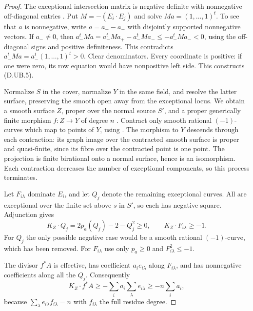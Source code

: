 \begin{proof}
The exceptional intersection matrix is negative definite
with nonnegative off-diagonal entries
\cite[section 10.1, Theorem 10.1]{Kollar2013D}.
Put $M=-(E_i\cdot E_j)$ and solve $Ma=(1,\ldots,1)^t$.
To see that $a$ is nonnegative, write $a=a_+-a_-$ with
disjointly supported nonnegative vectors. If $a_-\ne0$, then
$a_-^tMa=a_-^tMa_+-a_-^tMa_-\leq-a_-^tMa_-<0$,
using the off-diagonal signs and positive definiteness.
This contradicts $a_-^tMa=a_-^t(1,\ldots,1)^t>0$.
Clear denominators.
Every coordinate is positive: if one were zero, its row
equation would have nonpositive left side.
This constructs (D.UB.5).

Normalize $S$ in the cover, normalize $Y$ in the same field,
and resolve the latter surface, preserving the smooth open
away from the exceptional locus. We obtain a smooth surface
$Z$, proper over the normal source $S'$, and a proper
generically finite morphism $f:Z\to Y$ of degree $n$
\cite[Theorem 54.14.5, Tag 0BGP]{StacksDSurfaceResolution}.
Contract only smooth rational $(-1)$-curves which map to
points of $Y$, using
\cite[Lemma 54.16.8, Tag 0C2M]{StacksDSurfaceResolution}.
The morphism to $Y$ descends through each contraction:
its graph image over the contracted smooth surface is
proper and quasi-finite, since its fibre over the contracted
point is one point. The projection is finite birational onto
a normal surface, hence is an isomorphism.
Each contraction decreases the number of exceptional
components, so this process terminates.

Let $F_{i\lambda}$ dominate $E_i$, and let $Q_j$ denote the
remaining exceptional curves. All are exceptional over
the finite set above $s$ in $S'$, so each has negative square.
Adjunction gives
\[
        K_Z\cdot Q_j=2p_a(Q_j)-2-Q_j^2\geq0,\qquad
                          K_Z\cdot F_{i\lambda}\geq-1.    \tag{D.UB.7}
\]
For $Q_j$ the only possible negative case would be a
smooth rational $(-1)$-curve, which has been removed.
For $F_{i\lambda}$ use only $p_a\geq0$ and $F_{i\lambda}^2\leq-1$.

The divisor $f^*A$ is effective, has coefficient
$a_i e_{i\lambda}$ along $F_{i\lambda}$, and has nonnegative
coefficients along all the $Q_j$. Consequently
\[
       K_Z\cdot f^*A
          \geq-\sum_i a_i\sum_\lambda e_{i\lambda}
          \geq-n\sum_i a_i,                              \tag{D.UB.8}
\]
because $\sum_\lambda e_{i\lambda}f_{i\lambda}=n$ with
$f_{i\lambda}$ the full residue degree.


\end{proof}
